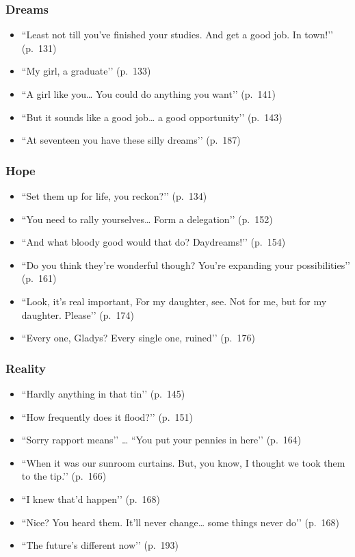 \documentclass[a4paper]{article}
\begin{document}
\subsubsection{Dreams}
\begin{itemize}
    \item ``Least not till you’ve finished your studies. And get a good job. In town!’’ (p.~131)
    \item ``My girl, a graduate’’ (p.~133)
    \item ``A girl like you… You could do anything you want’’ (p.~141)
    \item ``But it sounds like a good job… a good opportunity’’ (p.~143)
    \item ``At seventeen you have these silly dreams’’ (p.~187)
\end{itemize}

\subsubsection{Hope}
\begin{itemize}
    \item ``Set them up for life, you reckon?’’ (p.~134)
    \item ``You need to rally yourselves… Form a delegation’’ (p.~152)
    \item ``And what bloody good would that do? Daydreams!’’ (p.~154)
    \item ``Do you think they’re wonderful though? You’re expanding your possibilities’’ (p.~161)
    \item ``Look, it’s real important, For my daughter, see. Not for me, but for my daughter. Please’’ (p.~174)
    \item ``Every one, Gladys? Every single one, ruined’’ (p.~176)
\end{itemize}

\subsubsection{Reality}
\begin{itemize}
    \item ``Hardly anything in that tin’’ (p.~145)
    \item ``How frequently does it flood?’’ (p.~151)
    \item ``Sorry rapport means’’ … ``You put your pennies in here’’ (p.~164)
    \item ``When it was our sunroom curtains. But, you know, I thought we took them to the tip.’’ (p.~166)
    \item ``I knew that’d happen’’ (p.~168)
    \item ``Nice? You heard them. It’ll never change… some things never do’’ (p.~168)
    \item ``The future’s different now’’ (p.~193)
\end{itemize}
\end{document}
